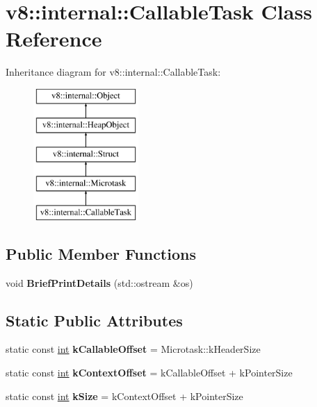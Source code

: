 \hypertarget{classv8_1_1internal_1_1CallableTask}{}\section{v8\+:\+:internal\+:\+:Callable\+Task Class Reference}
\label{classv8_1_1internal_1_1CallableTask}
Inheritance diagram for v8\+:\+:internal\+:\+:Callable\+Task\+:\begin{figure}[H]
\begin{center}
\leavevmode
\includegraphics[height=5.000000cm]{classv8_1_1internal_1_1CallableTask}
\end{center}
\end{figure}
\subsection*{Public Member Functions}
\begin{DoxyCompactItemize}
\item 
\mbox{\label{classv8_1_1internal_1_1CallableTask_a8669cd19a4e55fd1318e5c8c813db433}} 
void {\bfseries Brief\+Print\+Details} (std\+::ostream \&os)
\end{DoxyCompactItemize}
\subsection*{Static Public Attributes}
\begin{DoxyCompactItemize}
\item 
\mbox{\label{classv8_1_1internal_1_1CallableTask_a8e81e03a5a67c2f9da93500ee967b036}} 
static const \mbox{\hyperlink{classint}{int}} {\bfseries k\+Callable\+Offset} = Microtask\+::k\+Header\+Size
\item 
\mbox{\label{classv8_1_1internal_1_1CallableTask_ab862ffefbbfd769fe5618eb3cd49050a}} 
static const \mbox{\hyperlink{classint}{int}} {\bfseries k\+Context\+Offset} = k\+Callable\+Offset + k\+Pointer\+Size
\item 
\mbox{\label{classv8_1_1internal_1_1CallableTask_a170684c1eba37cb77e70ac59fea54866}} 
static const \mbox{\hyperlink{classint}{int}} {\bfseries k\+Size} = k\+Context\+Offset + k\+Pointer\+Size
\end{DoxyCompactItemize}
